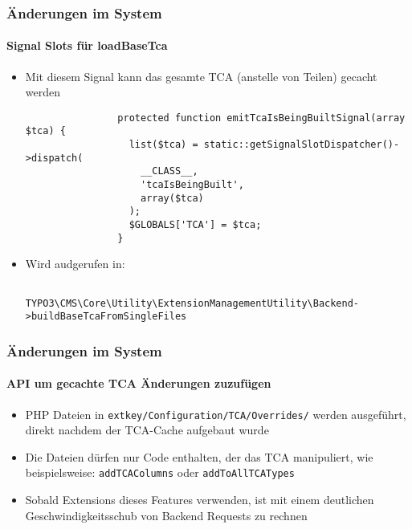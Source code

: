 \begin{frame}[fragile]
	\frametitle{Änderungen im System}
	\framesubtitle{Signal Slots für loadBaseTca}

	\begin{itemize}
		\item Mit diesem Signal kann das gesamte TCA (anstelle von Teilen) gecacht werden

			\begin{lstlisting}
				protected function emitTcaIsBeingBuiltSignal(array $tca) {
				  list($tca) = static::getSignalSlotDispatcher()->dispatch(
				    __CLASS__,
				    'tcaIsBeingBuilt',
				    array($tca)
				  );
				  $GLOBALS['TCA'] = $tca;
				}
			\end{lstlisting}

		\item Wird audgerufen in:

			\begin{lstlisting}
				TYPO3\CMS\Core\Utility\ExtensionManagementUtility\Backend->buildBaseTcaFromSingleFiles
			\end{lstlisting}

	\end{itemize}

\end{frame}  


\begin{frame}[fragile]
	\frametitle{Änderungen im System}
	\framesubtitle{API um gecachte TCA Änderungen zuzufügen}

	\begin{itemize}
		\item PHP Dateien in \texttt{extkey/Configuration/TCA/Overrides/}
			werden ausgeführt, direkt nachdem der TCA-Cache aufgebaut wurde

		\item Die Dateien dürfen nur Code enthalten, der das TCA manipuliert,\newline
			wie beispielsweise: \texttt{addTCAColumns} oder \texttt{addToAllTCATypes}

		\item Sobald Extensions dieses Features verwenden, ist mit einem deutlichen
			Geschwindigkeitsschub von Backend Requests zu rechnen

	\end{itemize}

\end{frame} 

